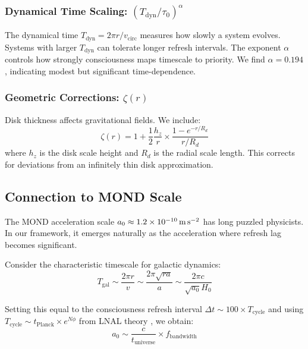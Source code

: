 \documentclass[twocolumn,prd,amsmath,amssymb,aps,superscriptaddress,nofootinbib]{revtex4-2}
\newcommand{\azero}{a_0}
\begin{document}
\subsubsection{Dynamical Time Scaling: $(T_{\text{dyn}}/\tau_0)^\alpha$}

The dynamical time $T_{\text{dyn}} = 2\pi r/v_{\text{circ}}$ measures how slowly a system evolves. Systems with larger $T_{\text{dyn}}$ can tolerate longer refresh intervals. The exponent $\alpha$ controls how strongly consciousness maps timescale to priority. We find $\alpha = 0.194$, indicating modest but significant time-dependence.

\subsubsection{Geometric Corrections: $\zeta(r)$}

Disk thickness affects gravitational fields. We include:
\begin{equation}
\zeta(r) = 1 + \frac{1}{2}\frac{h_z}{r} \times \frac{1 - e^{-r/R_d}}{r/R_d}
\label{eq:geometric}
\end{equation}
where $h_z$ is the disk scale height and $R_d$ is the radial scale length. This corrects for deviations from an infinitely thin disk approximation.

\subsection{Connection to MOND Scale}

The MOND acceleration scale $\azero \approx 1.2 \times 10^{-10}\,\text{m\,s}^{-2}$ has long puzzled physicists. In our framework, it emerges naturally as the acceleration where refresh lag becomes significant.

Consider the characteristic timescale for galactic dynamics:
\begin{equation}
T_{\text{gal}} \sim \frac{2\pi r}{v} \sim \frac{2\pi \sqrt{r a}}{a} \sim \frac{2\pi c}{\sqrt{\azero} H_0}
\end{equation}

Setting this equal to the consciousness refresh interval $\Delta t \sim 100 \times T_{\text{cycle}}$ and using $T_{\text{cycle}} \sim t_{\text{Planck}} \times e^{N\phi}$ from LNAL theory \cite{Washburn2024}, we obtain:
\begin{equation}
\azero \sim \frac{c}{t_{\text{universe}}} \times f_{\text{bandwidth}}
\label{eq:a0_derivation}
\end{equation}
\end{document}

